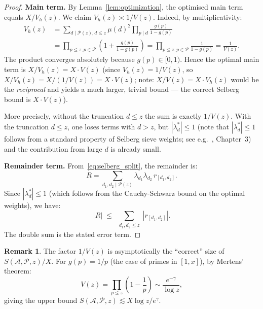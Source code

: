 \documentclass[12pt,a4paper]{amsart}
\theoremstyle{definition}
\newtheorem{remark}[theorem]{Remark}
\begin{document}
\begin{proof}
  \textbf{Main term.}
  By Lemma~\ref{lem:optimization}, the optimised main term equals $X/V_h(z)$.
  We claim $V_h(z) \asymp 1/V(z)$.  Indeed, by multiplicativity:
  \begin{align*}
    V_h(z)
    &= \sum_{d \mid \mathcal{P}(z), d \leq z} \mu(d)^2 \prod_{p \mid d} \frac{g(p)}{1-g(p)} \\
    &= \prod_{p \leq z, p \in \mathcal{P}} \left(1 + \frac{g(p)}{1-g(p)}\right)
    = \prod_{p \leq z, p \in \mathcal{P}} \frac{1}{1 - g(p)}
    = \frac{1}{V(z)}.
  \end{align*}
  The product converges absolutely because $g(p) \in [0,1)$.
  Hence the optimal main term is
  $X / V_h(z) = X \cdot V(z)$
  (since $V_h(z) = 1/V(z)$, so $X/V_h(z) = X/(1/V(z)) = X \cdot V(z)$;
  note: $X/V(z) = X \cdot V_h(z)$ would be the \emph{reciprocal} and yields a
  much larger, trivial bound --- the correct Selberg bound is $X \cdot V(z)$).

  More precisely, without the truncation $d \leq z$ the sum is exactly $1/V(z)$.
  With the truncation $d \leq z$, one loses terms with $d > z$, but
  $|\lambda_d^*| \leq 1$ (note that $|\lambda_d^*| \leq 1$ follows from a standard
  property of Selberg sieve weights; see e.g.\ \cite{CojocMurty}, Chapter~3)
  and the contribution from large $d$ is already small.

  \textbf{Remainder term.}
  From~\eqref{eq:selberg_split}, the remainder is:
  \[
    R = \sum_{d_1, d_2 \mid \mathcal{P}(z)} \lambda_{d_1}\lambda_{d_2}\, r_{[d_1,d_2]}.
  \]
  Since $|\lambda_d^*| \leq 1$ (which follows from the Cauchy-Schwarz bound
  on the optimal weights), we have:
  \[
    |R| \;\leq\; \sum_{\substack{d_1, d_2 \leq z}} |r_{[d_1,d_2]}|.
  \]
  The double sum is the stated error term.
\end{proof}

\begin{remark}
  The factor $1/V(z)$ is asymptotically the ``correct'' size of
  $S(\mathcal{A},\mathcal{P},z)/X$.  For $g(p) = 1/p$ (the case of
  primes in $[1,x]$), by Mertens' theorem:
  \[
    V(z) = \prod_{p \leq z} \left(1 - \frac{1}{p}\right) \sim \frac{e^{-\gamma}}{\log z},
  \]
  giving the upper bound $S(\mathcal{A},\mathcal{P},z) \lesssim X \log z / e^{\gamma}$.
\end{remark}
\end{document}
